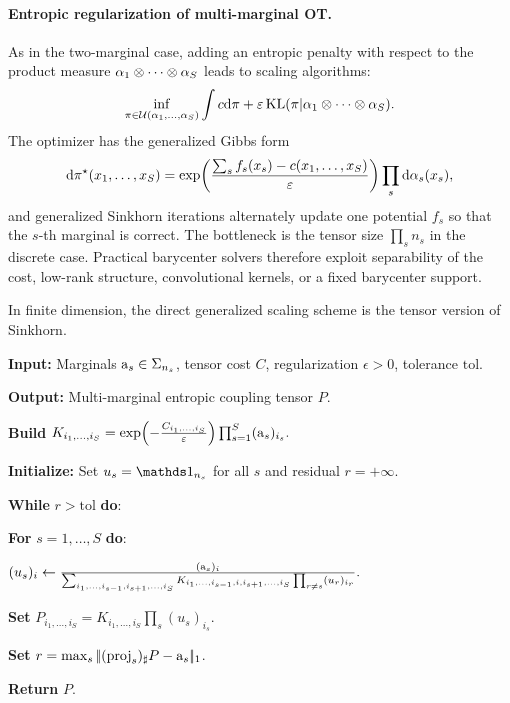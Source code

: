 \paragraph{Entropic regularization of multi-marginal OT.}

As in the two-marginal case, adding an entropic penalty with respect to the product measure $\alpha_1\otimes\cdots\otimes\alpha_S$ leads to scaling algorithms:
\[
	\inf_{\pi\in\mathcal{U}(\alpha_1,\ldots,\alpha_S)}
	\int c\mathrm{d}\pi+\varepsilon\operatorname{KL}(\pi|\alpha_1\otimes\cdots\otimes\alpha_S).
\]
The optimizer has the generalized Gibbs form
\[
	\mathrm{d}\pi^\star(x_1,\ldots,x_S)
	=
	\exp\!\left(\frac{\sum_s f_s(x_s)-c(x_1,\ldots,x_S)}{\varepsilon}\right)
	\prod_s\mathrm{d}\alpha_s(x_s),
\]
and generalized Sinkhorn iterations alternately update one potential $f_s$ so that the $s$-th marginal is correct. The bottleneck is the tensor size $\prod_s n_s$ in the discrete case. Practical barycenter solvers therefore exploit separability of the cost, low-rank structure, convolutional kernels, or a fixed barycenter support.

In finite dimension, the direct generalized scaling scheme is the tensor version of Sinkhorn.

\begin{alg}\label{alg:multimarginal-sinkhorn}
\textbf{Input:} Marginals $\mathrm{a}_s\in\Sigma_{n_s}$, tensor cost $C$, regularization $\epsilon>0$, tolerance $\mathrm{tol}$.

\textbf{Output:} Multi-marginal entropic coupling tensor $P$.

\textbf{Build}
\(K_{i_1,\ldots,i_S} = \exp\!\left(-\frac{C_{i_1,\ldots,i_S}}{\varepsilon}\right) \prod_{s=1}^S(\mathrm{a}_s)_{i_s}.\)

\textbf{Initialize:} Set \(u_s=\ones_{n_s}\) for all $s$ and residual \(r=+\infty\).

\textbf{While} \(r>\mathrm{tol}\) \textbf{do}:
\begin{algblock}

\textbf{For} $s=1,\ldots,S$ \textbf{do}:
\begin{algblock}
\((u_s)_i \leftarrow \frac{(\mathrm{a}_s)_i} { \sum_{i_1,\ldots,i_{s-1},i_{s+1},\ldots,i_S} K_{i_1,\ldots,i_{s-1},i,i_{s+1},\ldots,i_S} \prod_{r\neq s}(u_r)_{i_r}}.\)
\end{algblock}

\textbf{Set} \(P_{i_1,\ldots,i_S}=K_{i_1,\ldots,i_S}\prod_s (u_s)_{i_s}\).

\textbf{Set} \(r=\max_s|\!| (\mathrm{proj}_s)_\sharp P-\mathrm{a}_s |\!|_1\).
\end{algblock}
\algreturnskip
\textbf{Return} \(P\).
\end{alg}


